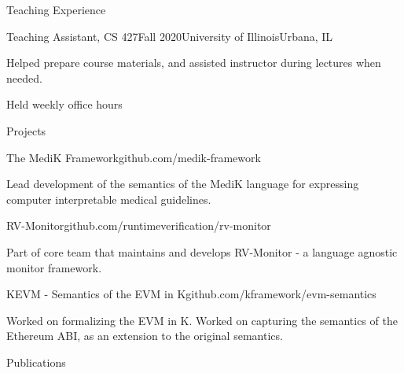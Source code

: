 \documentclass{resume} %
\begin{document}
\begin{rSection}{Teaching Experience}

\begin{rSubsection}{Teaching Assistant, CS 427}{Fall 2020}{University of Illinois}{Urbana, IL}
\item Helped prepare course materials, and assisted instructor during lectures
  when needed.
\item Held weekly office hours
\end{rSubsection}
\end{rSection}


\begin{rSection}{Projects}

\begin{rSubsection}{The MediK Framework}{github.com/medik-framework}{}{}
\item Lead development of the semantics of the MediK language for expressing
  computer interpretable medical guidelines.
\end{rSubsection}

\begin{rSubsection}{RV-Monitor}{github.com/runtimeverification/rv-monitor}{}{}
\item Part of core team that maintains and develops RV-Monitor - a language
  agnostic monitor framework.
\end{rSubsection}

\begin{rSubsection}{KEVM - Semantics of the EVM in K}{github.com/kframework/evm-semantics}{}{}
\item Worked on formalizing the EVM in K. Worked on capturing the semantics of the Ethereum ABI, as
  an extension to the original semantics.
\end{rSubsection}

\end{rSection}

\begin{rSection}{Publications}
    \item {}
    \item {}
    \item {}
    \item {}
    \item {}
    \item {}
    \item {}
\end{rSection}
\end{document}
